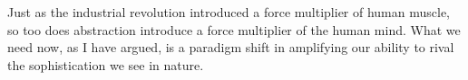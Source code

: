 

Just as the industrial revolution introduced a force multiplier of human muscle, so too does abstraction introduce a force multiplier of the human mind. What we need now, as I have argued, is a paradigm shift in amplifying our ability to rival the sophistication we see in nature. 

